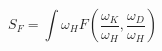 \begin{equation}\label{GenAct}
 S_F=\int\omega_{H}F(\frac{\omega_{K}}{\omega_{H}},\frac{\omega_{D}}{\omega_{H}})
\end{equation}

